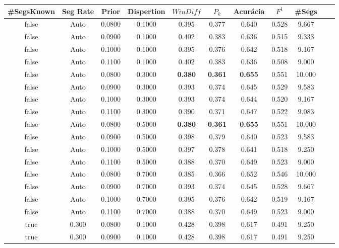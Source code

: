 \documentclass{article}
\begin{document}
\begin{longtable}[c]{|c|c|c|c|c|c|c|c|c|c|c|} 
\hline 
 \#SegsKnown & Seg Rate & Prior & Dispertion & $WinDiff$ & $P_k$ & Acurácia & $F^1$ & \#Segs\\ \hline 
 false & Auto & 0.0800 & 0.1000 & 0.395 & 0.377 & 0.640 & 0.528 & 9.667  \\ \hline 
 false & Auto & 0.0900 & 0.1000 & 0.402 & 0.383 & 0.636 & 0.515 & 9.333  \\ \hline 
 false & Auto & 0.1000 & 0.1000 & 0.395 & 0.376 & 0.642 & 0.518 & 9.167  \\ \hline 
 false & Auto & 0.1100 & 0.1000 & 0.402 & 0.383 & 0.636 & 0.508 & 9.000  \\ \hline 
 false & Auto & 0.0800 & 0.3000 & \cellcolor{gray!20} \textbf{0.380} & \cellcolor{gray!20} \textbf{0.361} & \cellcolor{gray!20} \textbf{0.655} & 0.551 & 10.000  \\ \hline 
 false & Auto & 0.0900 & 0.3000 & 0.393 & 0.374 & 0.645 & 0.529 & 9.583  \\ \hline 
 false & Auto & 0.1000 & 0.3000 & 0.393 & 0.374 & 0.644 & 0.520 & 9.167  \\ \hline 
 false & Auto & 0.1100 & 0.3000 & 0.390 & 0.371 & 0.647 & 0.522 & 9.083  \\ \hline 
 false & Auto & 0.0800 & 0.5000 & \cellcolor{gray!20} \textbf{0.380} & \cellcolor{gray!20} \textbf{0.361} & \cellcolor{gray!20} \textbf{0.655} & 0.551 & 10.000  \\ \hline 
 false & Auto & 0.0900 & 0.5000 & 0.398 & 0.379 & 0.640 & 0.523 & 9.583  \\ \hline 
 false & Auto & 0.1000 & 0.5000 & 0.397 & 0.378 & 0.641 & 0.518 & 9.250  \\ \hline 
 false & Auto & 0.1100 & 0.5000 & 0.388 & 0.370 & 0.649 & 0.523 & 9.000  \\ \hline 
 false & Auto & 0.0800 & 0.7000 & 0.385 & 0.366 & 0.652 & 0.546 & 10.000  \\ \hline 
 false & Auto & 0.0900 & 0.7000 & 0.393 & 0.374 & 0.645 & 0.528 & 9.667  \\ \hline 
 false & Auto & 0.1000 & 0.7000 & 0.395 & 0.376 & 0.642 & 0.519 & 9.167  \\ \hline 
 false & Auto & 0.1100 & 0.7000 & 0.388 & 0.370 & 0.649 & 0.523 & 9.000  \\ \hline 
 true & 0.300 & 0.0800 & 0.1000 & 0.428 & 0.398 & 0.617 & 0.491 & 9.250  \\ \hline 
 true & 0.300 & 0.0900 & 0.1000 & 0.428 & 0.398 & 0.617 & 0.491 & 9.250  \\ \hline 

\end{longtable}
\end{document}
